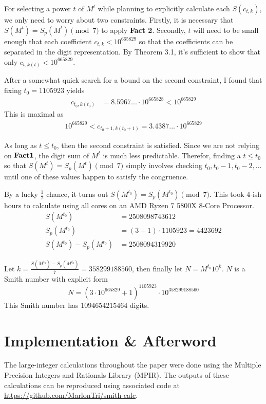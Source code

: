 \documentclass{amsart}
\newcommand{\ME}{{665829}}
\numberwithin{equation}{section}
\theoremstyle{plain} %
\theoremstyle{definition}
\theoremstyle{remark}
\begin{document}
For selecting a power $t$ of $M^t$ while planning to explicitly calculate each $S(c_{t,k})$, we only need to worry about two constraints. Firstly, it is necessary that $S(M^t) = S_p(M^t) \pmod{7}$ to apply {\bf Fact 2}. Secondly, $t$ will need to be small enough that each coefficient $c_{t,k} < 10^\ME$ so that the coefficients can be separated in the digit representation. By Theorem 3.1, it's sufficient to show that only $c_{t,k(t)} < 10^\ME$.

After a somewhat quick search for a bound on the second constraint, I found that fixing $t_0 = 1105923$ yields
\begin{align*}
c_{t_0,k(t_0)} &=          8.5967... \cdot 10 ^{665828}  < 10^{665829}
\end{align*}
This is maximal as 
\begin{align*}
10^{665829} < c_{t_0+1,k(t_0 + 1)}  =    3.4387... \cdot 10 ^{665829}
\end{align*}

As long as $t \leq t_0$, then the second constraint is satisfied. Since we are not relying on ${\bf Fact 1}$, the digit sum of $M^t$ is much less predictable. Therefor, finding a $t \leq t_0$ so that $S(M^t) = S_p(M^t) \pmod{7}$ simply involves checking $t_0, t_0 -1 , t_0 -2,...$ until one of these values happen to satisfy the congruence.

By a lucky $\frac{1}{7}$ chance, it turns out $S(M^{t_0}) =  S_p(M^{t_0}) \pmod{7}$. This took 4-ish hours to calculate using all cores on an AMD Ryzen 7 5800X 8-Core Processor.
\begin{align*}
S(M^{t_0})&=  2508098743612       \\
S_p(M^{t_0}) &= (3+ 1) \cdot  1105923 =  4423692   \\
S(M^{t_0}) -  S_p(M^{t_0}) &= 2508094319920
\end{align*}

Let $k = \frac{S(M^{t_0}) -  S_p(M^{t_0}) }{7} = 358299188560$, then finally let $N = M^{t_0} 10^k$. $N$ is a Smith number with explicit form
$$N = (3\cdot 10^\ME + 1)^{1105923} \cdot 10^{358299188560}$$
This Smith number has $\num{1094654215464}$ digits.
\,\\ \section{Implementation \& Afterword}
The large-integer calculations throughout the paper were done using the Multiple Precision Integers and Rationals Library (MPIR). The outputs of these calculations can be reproduced using associated code at
 \url{https://github.com/MarlonTri/smith-calc}.
\end{document}
